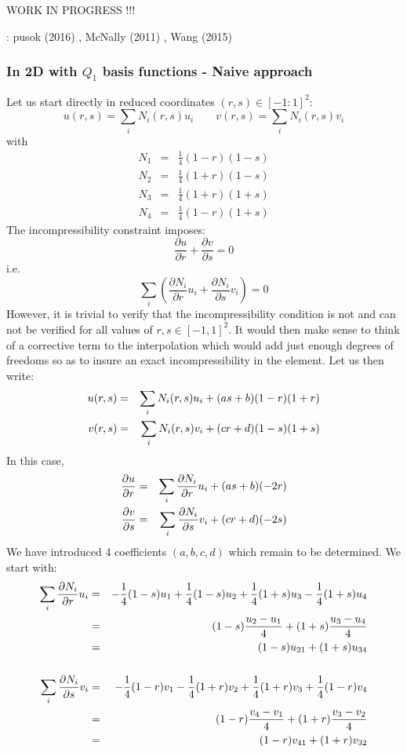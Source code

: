 
WORK IN PROGRESS !!!


\Literature: pusok \etal (2016) \cite{pukp16}, McNally (2011) \cite{mcna11}, Wang \etal (2015) \cite{waav15}

\subsubsection{In 2D with $Q_1$ basis functions - Naive approach}

Let us start directly in reduced coordinates $(r,s)\in [-1:1]^2$:
\[
u(r,s)=\sum_i N_i(r,s) u_i
\quad
\quad
v(r,s)=\sum_i N_i(r,s) v_i
\]
with 
\begin{eqnarray}
N_1&=& \frac{1}{4}(1-r)(1-s)  \nonumber\\ 
N_2&=& \frac{1}{4}(1+r)(1-s)  \nonumber\\ 
N_3&=& \frac{1}{4}(1+r)(1+s)  \nonumber\\ 
N_4&=& \frac{1}{4}(1-r)(1+s)  \nonumber
\end{eqnarray}
The incompressibility constraint imposes:
\[
\frac{\partial u}{\partial r}+
\frac{\partial v}{\partial s}=0
\]
i.e.
\[
\sum_i \left(  
\frac{\partial N_i}{\partial r} u_i+
\frac{\partial N_i}{\partial s} v_i
\right)
=0
\]
However, it is trivial to verify that the incompressibility 
condition is not and can not be verified for all values of  
$r,s \in [-1,1]^2$.
It would then make sense to think of a corrective term to the interpolation
which would add just enough degrees of freedoms so as to insure an exact
incompressibility in the element. 
Let us then write:
\begin{eqnarray}
u(r,s)&=&\sum_i N_i(r,s) u_i + (a s + b)(1-r)(1+r) \nonumber\\
v(r,s)&=&\sum_i N_i(r,s) v_i + (c r + d)(1-s)(1+s) \nonumber
\end{eqnarray}
In this case,
\begin{eqnarray}
\frac{\partial u}{\partial r}&=&\sum_i \frac{\partial N_i}{\partial r} u_i + (a s + b) (-2r) \nonumber\\
\frac{\partial v}{\partial s}&=&\sum_i \frac{\partial N_i}{\partial s} v_i + (c r + d)(-2s) \nonumber
\end{eqnarray}
We have introduced 4 coefficients  $(a,b,c,d)$ which remain to be determined. 
We start with:
\begin{eqnarray}
\sum_i \frac{\partial N_i}{\partial r} u_i 
&=& -\frac{1}{4} (1-s) u_1 + \frac{1}{4} (1-s) u_2 +\frac{1}{4} (1+s) u_3 -\frac{1}{4} (1+s) u_4 \nonumber\\
&=& (1-s) \frac{u_2-u_1}{4} + (1+s) \frac{u_3-u_4}{4} \nonumber\\
&=& (1-s) u_{21} + (1+s) u_{34} \nonumber\\
\nonumber\\
\sum_i \frac{\partial N_i}{\partial s} v_i 
&=& -\frac{1}{4} (1-r) v_1 - \frac{1}{4} (1+r) v_2 +\frac{1}{4} (1+r) v_3 +\frac{1}{4} (1-r) v_4 \nonumber\\
&=& (1-r) \frac{v_4-v_1}{4} + (1+r)\frac{v_3-v_2}{4} \nonumber\\
&=& (1-r) v_{41} + (1+r) v_{32} \nonumber
\end{eqnarray}
